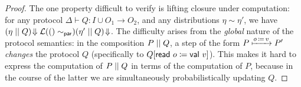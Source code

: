 \begin{proof}
The one property difficult to verify is lifting closure under computation: for any protocol $\Delta \vdash Q : I \cup O_1 \to O_2$, and any distributions $\eta \sim \eta'$, we have $(\eta \; || \; Q) \! \Downarrow \mathcal{L}(()\sim_\mathsf{par}) (\eta' \; || \; Q) \! \Downarrow$. The difficulty arises from the \emph{global} nature of the protocol semantics: in the composition $P \; || \; Q$, a step of the form $P \xmapsto{o \, \coloneqq \, v} P'$ \emph{changes} the protocol $Q$ (specifically to $Q[\mathsf{read} \ o \coloneqq \mathsf{val} \ v]$). This makes it hard to express the computation of $P \; || \; Q$ in terms of the computation of $P$, because in the course of the latter we are simultaneously probabilistically updating $Q$.
%
%
%
%

\end{proof}
